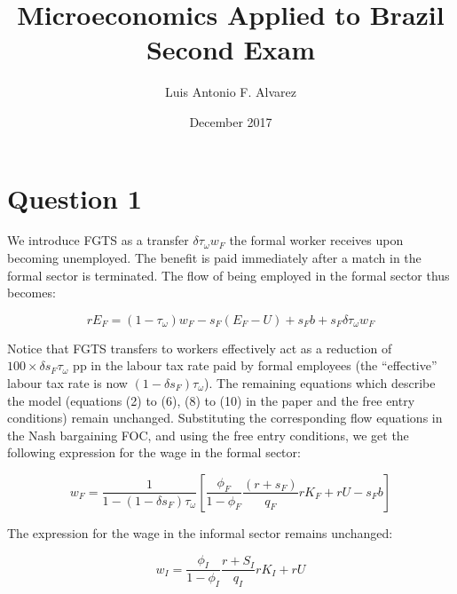 \documentclass[12pt]{article}
\title{Microeconomics Applied to Brazil \\ Second Exam}
\author{Luis Antonio F. Alvarez}
\date{December 2017}
\begin{document}
\maketitle

\section*{Question 1}

We introduce FGTS as a transfer $\delta \tau_\omega w_F $ the formal worker receives upon becoming unemployed. The benefit is paid immediately after a match in the formal sector is terminated. The flow of being employed in the formal sector thus becomes:

\begin{equation}
    r E_F = (1 - \tau_\omega) w_F - s_F (E_F - U) + s_F b + s_F \delta \tau_\omega w_F 
\end{equation}

Notice that FGTS transfers to workers effectively act as a reduction of $100 \times \delta s_F \tau_\omega$ pp in the labour tax rate paid by formal employees (the ``effective'' labour tax rate is now $(1 - \delta s_F)\tau_\omega$). The remaining equations which describe the model (equations (2) to (6), (8) to (10) in the paper and the free entry conditions)  remain unchanged. Substituting the corresponding flow equations in the Nash bargaining FOC, and using the free entry conditions, we get the following expression for the wage in the formal sector:

\begin{equation}
    w_F = \frac{1}{1 - (1 - \delta s_F)\tau_\omega} \left[\frac{\phi_F}{1-\phi_F}\frac{(r+s_F)}{q_F}rK_F +rU-s_Fb\right]
\end{equation}

The expression for the wage in the informal sector remains unchanged:

\begin{equation}
    w_I = \frac{\phi_I}{1-\phi_I} \frac{r + S_I}{q_I} r K_I + rU
\end{equation}
\end{document}
